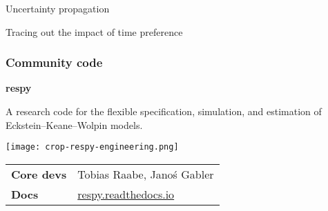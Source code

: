 \begin{frame}{Uncertainty propagation}
  \begin{figure}[h!]\centering
  \end{figure}
\end{frame}
\begin{frame}{Tracing out the impact of time preference}\vspace{0.3cm}
  \begin{figure}[h!]\centering
\end{figure}\vspace{-0.5cm}
  \hyperlink{fig:final-school-policy}{}
\end{frame}
\begin{frame}\frametitle{Community code}

\vspace{0.3cm}\textbf{\hspace{0.05cm} {\Large respy}}\vspace{0.50cm}

A research code for the flexible specification, simulation, and estimation of Eckstein--Keane--Wolpin models.\\
\vspace{0.45cm}

\texttt{[image: crop-respy-engineering.png]}\\
\vspace{0.50cm}

\hspace{-0.2cm}\begin{tabular}{ll}
\textbf{Core devs} & Tobias Raabe, Janoś Gabler\\
\textbf{Docs}      & \url{respy.readthedocs.io}
\end{tabular}

\end{frame}
